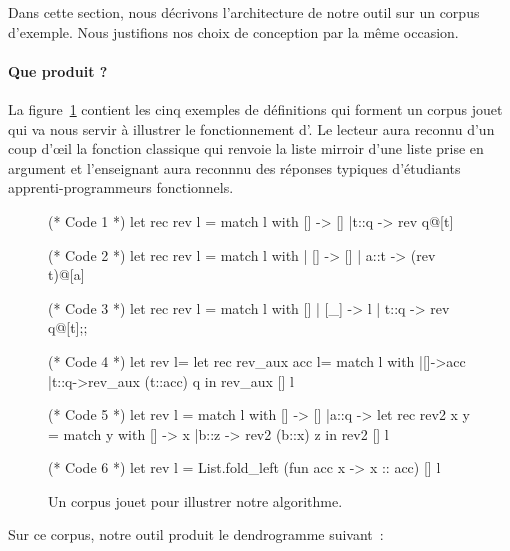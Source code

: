 Dans cette section, nous décrivons l'architecture de notre outil sur
un corpus d'exemple. Nous justifions nos choix de conception par la
même occasion.


\paragraph{Que produit {\Asak}?}
La figure~\ref{fig:example:sources} contient les cinq
exemples de définitions {\OCaml} qui forment un corpus jouet
qui va nous servir à illustrer le fonctionnement d'{\Asak}.
Le lecteur aura reconnu d'un coup d'{\oe}il la fonction classique qui
renvoie la liste mirroir d'une liste prise en argument et l'enseignant
aura reconnnu des réponses typiques d'étudiants apprenti-programmeurs
fonctionnels.

\begin{figure}

\begin{ocaml}
(* Code 1 *)
let rec rev l = match l with
    [] -> []
  |t::q -> rev q@[t]

(* Code 2 *)
let rec rev l =
  match l with
  | [] -> []
  | a::t -> (rev t)@[a]

(* Code 3 *)
let rec rev l = match l with
    [] | [_] -> l
  | t::q -> rev q@[t];;

(* Code 4 *)
let rev l=
  let rec rev_aux acc l=
    match l with
    |[]->acc
    |t::q->rev_aux (t::acc) q
  in rev_aux [] l

(* Code 5 *)
let rev l =
  match l with
    [] -> []
  |a::q -> let rec rev2 x y = match y with
        [] -> x
      |b::z -> rev2 (b::x) z in rev2 [] l

(* Code 6 *)
let rev l =
  List.fold_left (fun acc x -> x :: acc) [] l
\end{ocaml}

\label{fig:example:sources}
\caption{Un corpus jouet pour illustrer notre algorithme.}
\end{figure}

Sur ce corpus, notre outil produit le dendrogramme suivant~:

